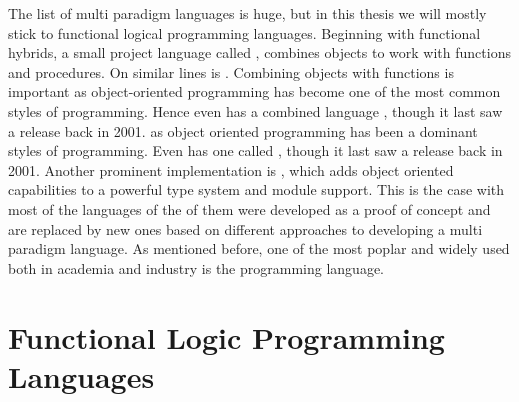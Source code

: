 \documentclass[thesis-solanki.tex]{subfiles}
\begin{document}
The list of multi paradigm languages is huge, but in this thesis we will mostly stick to functional logical
programming languages. Beginning with functional hybrids, a small project language called 
\cite{website:virgil}, combines objects to work with functions and procedures.
On similar lines is  \cite{website:closwiki}.
Combining objects with functions is important as object-oriented programming has become one of the most common styles of programming. Hence 
even  has a combined language , though it last saw a 
release back in 2001.
as object oriented programming has been a dominant styles of programming. Even  has one called 
\cite{website:ohaskell},
though it last saw a release back in 2001.
Another prominent implementation is 
\cite{website:ocamlwiki,website:ocamllang},
which adds object oriented capabilities to a powerful type system and module support.
This is the case with most of the languages of the  of them were developed as a proof of concept and are replaced by 
new ones based on different approaches to developing a multi paradigm language.
As mentioned before, one of the most poplar \cite{website:langpop} and widely used both in academia and industry is
the  \cite{website:scala} programming language.


\section{Functional Logic Programming Languages}
\end{document}
